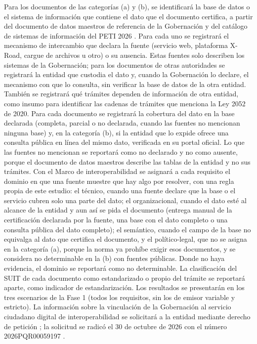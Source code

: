 Para los documentos de las categorías (a) y (b), se identificará la base de datos o el sistema de información que contiene el dato que el documento certifica, a partir del documento de datos maestros de referencia de la Gobernación \parencite{gobernaciondelhuila2026datosmaestros} y del catálogo de sistemas de información del PETI 2026 \parencite{gobernaciondelhuila2026peti}. Para cada uno se registrará el mecanismo de intercambio que declara la fuente (servicio web, plataforma X-Road, cargue de archivos u otro) o su ausencia. Estas fuentes solo describen los sistemas de la Gobernación; para los documentos de otras autoridades se registrará la entidad que custodia el dato y, cuando la Gobernación lo declare, el mecanismo con que lo consulta, sin verificar la base de datos de la otra entidad. También se registrará qué trámites dependen de información de otra entidad, como insumo para identificar las cadenas de trámites que menciona la Ley 2052 de 2020. Para cada documento se registrará la cobertura del dato en la base declarada (completa, parcial o no declarada, cuando las fuentes no mencionan ninguna base) y, en la categoría (b), si la entidad que lo expide ofrece una consulta pública en línea del mismo dato, verificada en su portal oficial. Lo que las fuentes no mencionan se reportará como no declarado y no como ausente, porque el documento de datos maestros describe las tablas de la entidad y no sus trámites. Con el Marco de interoperabilidad \parencite{mintic2019marco} se asignará a cada requisito el dominio en que una fuente muestre que hay algo por resolver, con una regla propia de este estudio: el técnico, cuando una fuente declare que la base o el servicio cubren solo una parte del dato; el organizacional, cuando el dato esté al alcance de la entidad y aun así se pida el documento (entrega manual de la certificación declarada por la fuente, una base con el dato completo o una consulta pública del dato completo); el semántico, cuando el campo de la base no equivalga al dato que certifica el documento, y el político-legal, que no se asigna en la categoría (a), porque la norma ya prohíbe exigir esos documentos, y se considera no determinable en la (b) con fuentes públicas. Donde no haya evidencia, el dominio se reportará como no determinable. La clasificación del SUIT de cada documento como estandarizado o propio del trámite se reportará aparte, como indicador de estandarización. Los resultados se presentarán en los tres escenarios de la Fase 1 (todos los requisitos, sin los de emisor variable y estricto). La información sobre la vinculación de la Gobernación al servicio ciudadano digital de interoperabilidad se solicitará a la entidad mediante derecho de petición ; la solicitud se radicó el 30 de octubre de 2026 con el número 2026PQR00059197 .

